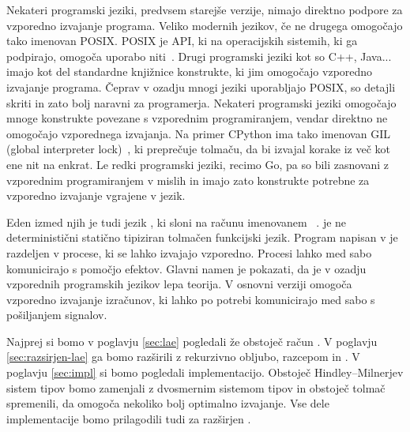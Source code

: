 Nekateri programski jeziki, predvsem starejše verzije, nimajo direktno podpore za vzporedno izvajanje programa. 
Veliko modernih jezikov, če ne drugega omogočajo tako imenovan POSIX. POSIX je API, ki na operacijskih sistemih, ki ga podpirajo, omogoča uporabo niti~\cite{posix}.
Drugi programski jeziki kot so C++, Java... imajo kot del standardne knjižnice konstrukte, ki jim omogočajo vzporedno izvajanje programa. Čeprav v ozadju mnogi jeziki uporabljajo POSIX, so detajli skriti in zato bolj naravni za programerja. 
Nekateri programski jeziki omogočajo mnoge konstrukte povezane s vzporednim programiranjem, vendar direktno ne omogočajo vzporednega izvajanja. Na primer CPython ima tako imenovan GIL (global  interpreter lock)~\cite{gil}, ki preprečuje tolmaču, da bi izvajal korake iz več kot ene nit na enkrat.
Le redki programski jeziki, recimo Go, pa so bili zasnovani z vzporednim programiranjem v mislih in imajo zato konstrukte potrebne za vzporedno izvajanje vgrajene v jezik.


Eden izmed njih je tudi jezik \aeff{}, ki sloni na računu imenovanem \lae~\cite{aeff}. \aeff{} je ne deterministični statično tipiziran tolmačen funkcijski jezik. Program napisan v \aeff{} je razdeljen v procese, ki se lahko izvajajo vzporedno. Procesi lahko med sabo komunicirajo s pomočjo efektov.  Glavni namen \lae{} je pokazati, da je v ozadju vzporednih programskih jezikov lepa teorija. V osnovni verziji \aeff{} omogoča vzporedno izvajanje izračunov, ki lahko po potrebi komunicirajo med sabo s pošiljanjem signalov. 


Najprej si bomo v poglavju \ref{sec:lae} pogledali že obstoječ račun \lae{}. V poglavju \ref{sec:razsirjen-lae} ga bomo razširili z rekurzivno obljubo, razcepom in . V poglavju \ref{sec:impl} si bomo pogledali implementacijo. Obstoječ Hindley–Milnerjev sistem tipov bomo zamenjali z dvosmernim sistemom tipov in obstoječ tolmač spremenili, da omogoča nekoliko bolj optimalno izvajanje. Vse dele implementacije bomo prilagodili tudi za razširjen \lae.
